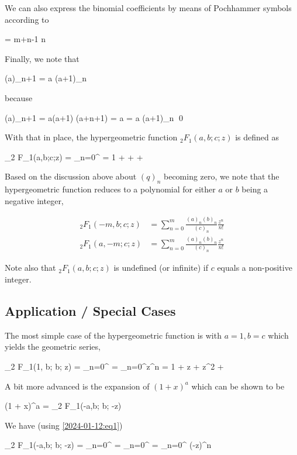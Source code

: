 We can also express the binomial coefficients by means of Pochhammer symbols according to

\be
\label{2024-01-12:eq2}
 = {m+n-1 \choose n}
\ee

Finally, we note that

\bee
(a)_{n+1} = a (a+1)_n
\eee

because

\bee
(a)_{n+1} = a(a+1) \cdots (a+n+1) = a  = a (a+1)_n \qed
\eee


With that in place, the hypergeometric function $_2 F_1(a,b;c;z)$ is defined as

\bee
_2 F_1(a,b;c;z) = \sum_{n=0}^\infty {}  = 1 +   +   + \cdots
\eee

Based on the discussion above about $(q)_n$ becoming zero, we note that the hypergeometric function reduces to a polynomial for either $a$ or $b$ being a negative integer,

\begin{align*}
_2 F_1(-m,b;c;z) &= \sum_{n=0}^m \frac{(a)_n (b)_n}{(c)_n} \frac{z^n}{n!} \\
_2 F_1(a,-m;c;z) &= \sum_{n=0}^m \frac{(a)_n (b)_n}{(c)_n} \frac{z^n}{n!}
\end{align*}

Note also that $_2 F_1(a,b;c;z)$ is undefined (or infinite) if $c$ equals a non-positive integer.

\subsection{Application / Special Cases}

The most simple case of the hypergeometric function is with $a = 1, b = c$ which yields the geometric series,

\bee
_2 F_1(1, b; b; z) = \sum_{n=0}^\infty {}  = \sum_{n=0}^\infty z^n = 1 + z + z^2 + \cdots
\eee

A bit more advanced is the expansion of $(1 + x)^a$ which can be shown to be

\bee
(1 + x)^a = _2 F_1(-a,b; b; -z)
\eee

We have (using \eqref{2024-01-12:eq1})

\bee
_2 F_1(-a,b; b; -z) = \sum_{n=0}^\infty {}  = \sum_{n=0}^\infty {} = \sum_{n=0}^ (-z)^n
\eee

